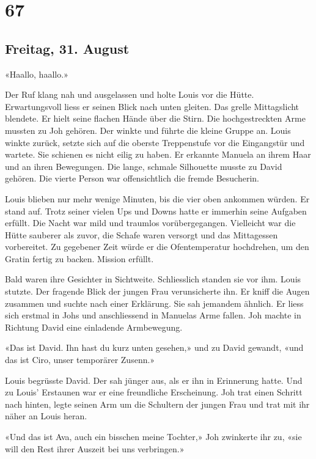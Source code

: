 \chapter{67}


\section{Freitag, 31. August}

«Haallo, haallo.»

Der Ruf klang nah und ausgelassen und holte Louis vor die Hütte.
Erwartungsvoll liess er seinen Blick nach unten gleiten. Das grelle
Mittagslicht blendete. Er hielt seine flachen Hände über die Stirn. Die
hochgestreckten Arme mussten zu Joh gehören. Der winkte und führte die
kleine Gruppe an. Louis winkte zurück, setzte sich auf die oberste
Treppenstufe vor die Eingangstür und wartete. Sie schienen es nicht eilig zu haben. Er erkannte Manuela an ihrem Haar und an ihren Bewegungen. Die lange, schmale Silhouette musste zu David gehören. Die vierte Person war offensichtlich die fremde Besucherin.

Louis blieben nur mehr wenige Minuten, bis die vier oben ankommen
würden. Er stand auf. Trotz seiner vielen Ups und Downs hatte er immerhin seine
Aufgaben erfüllt. Die Nacht war mild und traumlos vorübergegangen.
Vielleicht war die Hütte sauberer als zuvor, die Schafe waren versorgt
und das Mittagessen vorbereitet. Zu gegebener Zeit würde er die
Ofentemperatur hochdrehen, um den Gratin fertig zu backen. Mission
erfüllt. 

Bald waren ihre Gesichter in Sichtweite. Schliesslich standen sie vor
ihm. Louis stutzte. Der fragende Blick der jungen Frau verunsicherte ihn.
Er kniff die Augen zusammen und suchte nach einer Erklärung. Sie sah
jemandem ähnlich. Er liess sich erstmal in Johs und anschliessend in
Manuelas Arme fallen. Joh machte in Richtung David eine einladende Armbewegung. 

«Das ist David. Ihn hast du kurz unten gesehen,» und zu David gewandt,
«und das ist Ciro, unser temporärer Zusenn.»

Louis begrüsste David. Der sah jünger aus, als er ihn in Erinnerung
hatte. Und zu Louis’ Erstaunen war er eine freundliche Erscheinung. Joh trat einen Schritt nach hinten, legte seinen Arm um die Schultern der jungen Frau und trat mit ihr näher an Louis heran.

«Und das ist Ava, auch ein bisschen meine Tochter,» Joh zwinkerte ihr
zu, «sie will den Rest ihrer Auszeit bei uns verbringen.»

